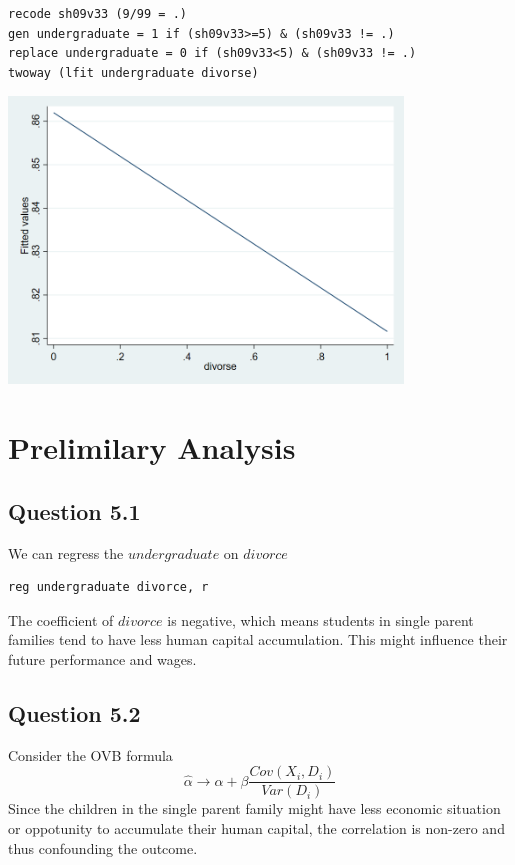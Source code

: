 \documentclass[11pt, letterpaper]{article}
\begin{document}
\begin{lstlisting}
recode sh09v33 (9/99 = .)
gen undergraduate = 1 if (sh09v33>=5) & (sh09v33 != .)
replace undergraduate = 0 if (sh09v33<5) & (sh09v33 != .)
twoway (lfit undergraduate divorse)
\end{lstlisting}
\includegraphics[height=3in]{twoway.png}


\section{Prelimilary Analysis}

\subsection*{Question 5.1}

We can regress the $\textit{undergraduate}$ on $\textit{divorce}$

\begin{lstlisting}
reg undergraduate divorce, r
\end{lstlisting}
The coefficient of $\textit{divorce}$ is negative, which means students in single parent families tend to have less human capital accumulation. This might influence their future performance and wages.


\subsection*{Question 5.2}

Consider the OVB formula 
\[
    \hat{\alpha} \to \alpha + \beta\frac{ Cov (X_i,D_i)}{ \textit{Var} (D_i)}
\]
Since the children in the single parent family might have less economic situation or oppotunity to accumulate their human capital, the correlation is non-zero and thus confounding the outcome.
\end{document}
